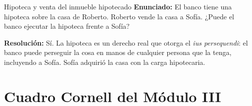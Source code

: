 \documentclass[12pt,oneside]{book}
\begin{document}
\begin{exercise}{Hipoteca y venta del inmueble hipotecado}
\textbf{Enunciado:} El banco tiene una hipoteca sobre la casa de Roberto. Roberto vende la casa a Sof\'ia. ¿Puede el banco ejecutar la hipoteca frente a Sof\'ia?

\textbf{Resoluci\'on:} S\'i. La hipoteca es un derecho real que otorga el \textit{ius persequendi}: el banco puede perseguir la cosa en manos de cualquier persona que la tenga, incluyendo a Sof\'ia. Sof\'ia adquiri\'o la casa con la carga hipotecaria.
\end{exercise}

\section{Cuadro Cornell del M\'odulo III}
\end{document}
